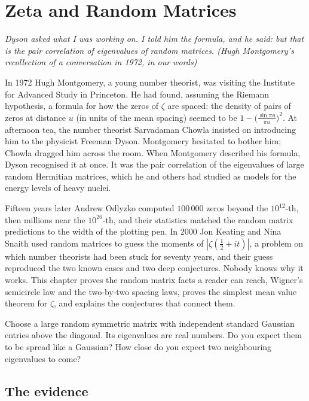 \chapter{Zeta and Random Matrices}\label{moments:ch:zetarmt}

\begin{center}\itshape
Dyson asked what I was working on. I told him the formula, and he said: but that is the pair correlation of eigenvalues of random matrices.
\upshape(Hugh Montgomery's recollection of a conversation in 1972, in our words)
\end{center}

In 1972 Hugh Montgomery, a young number theorist, was visiting the Institute for Advanced Study in Princeton. He had
found, assuming the Riemann hypothesis, a formula for how the zeros of $\zeta$ are spaced: the density of pairs of zeros at distance $u$ (in units of
the mean spacing) seemed to be $1-\bigl(\frac{\sin\pi u}{\pi u}\bigr)^2$. At afternoon tea, the number theorist Sarvadaman Chowla insisted on
introducing him to the physicist Freeman Dyson. Montgomery hesitated to bother him; Chowla dragged him across the room. When Montgomery described his
formula, Dyson recognised it at once. It was the pair correlation of the eigenvalues of large random Hermitian matrices, which he and others had
studied as models for the energy levels of heavy nuclei.

Fifteen years later Andrew Odlyzko computed $100\,000$ zeros beyond the $10^{12}$-th, then millions near the $10^{20}$-th, and their statistics matched
the random matrix predictions to the width of the plotting pen. In 2000 Jon Keating and Nina Snaith used random matrices to guess the moments of
$|\zeta(\frac12+it)|$, a problem on which number theorists had been stuck for seventy years, and their guess reproduced the two known cases and two
deep conjectures. Nobody knows why it works. This chapter proves the random matrix facts a reader can reach, Wigner's semicircle law and the
two-by-two spacing laws, proves the simplest mean value theorem for $\zeta$, and explains the conjectures that connect them.

\begin{think}
Choose a large random symmetric matrix with independent standard Gaussian entries above the diagonal. Its eigenvalues are real numbers. Do you expect them
to be spread like a Gaussian? How close do you expect two neighbouring eigenvalues to come?
\end{think}

\section{The evidence}

